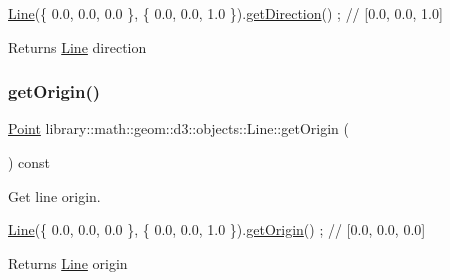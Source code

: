 \begin{DoxyCode}
\hyperlink{classlibrary_1_1math_1_1geom_1_1d3_1_1objects_1_1_line_a762e529453ff9ffa9233fd73737f4692}{Line}(\{ 0.0, 0.0, 0.0 \}, \{ 0.0, 0.0, 1.0 \}).\hyperlink{classlibrary_1_1math_1_1geom_1_1d3_1_1objects_1_1_line_aa108a53227e4326188fe17a03c55f9cb}{getDirection}() ; \textcolor{comment}{// [0.0, 0.0, 1.0]}
\end{DoxyCode}


\begin{DoxyReturn}{Returns}
\hyperlink{classlibrary_1_1math_1_1geom_1_1d3_1_1objects_1_1_line}{Line} direction 
\end{DoxyReturn}
\mbox{\label{classlibrary_1_1math_1_1geom_1_1d3_1_1objects_1_1_line_ad65178573d705ad21bdd54e7f4b7f104}} 
\subsubsection{\texorpdfstring{get\+Origin()}{getOrigin()}}
{\footnotesize\ttfamily \hyperlink{classlibrary_1_1math_1_1geom_1_1d3_1_1objects_1_1_point}{Point} library\+::math\+::geom\+::d3\+::objects\+::\+Line\+::get\+Origin (\begin{DoxyParamCaption}{ }\end{DoxyParamCaption}) const}



Get line origin. 


\begin{DoxyCode}
\hyperlink{classlibrary_1_1math_1_1geom_1_1d3_1_1objects_1_1_line_a762e529453ff9ffa9233fd73737f4692}{Line}(\{ 0.0, 0.0, 0.0 \}, \{ 0.0, 0.0, 1.0 \}).\hyperlink{classlibrary_1_1math_1_1geom_1_1d3_1_1objects_1_1_line_ad65178573d705ad21bdd54e7f4b7f104}{getOrigin}() ; \textcolor{comment}{// [0.0, 0.0, 0.0]}
\end{DoxyCode}


\begin{DoxyReturn}{Returns}
\hyperlink{classlibrary_1_1math_1_1geom_1_1d3_1_1objects_1_1_line}{Line} origin 
\end{DoxyReturn}
\mbox{\label{classlibrary_1_1math_1_1geom_1_1d3_1_1objects_1_1_line_af40668ee33a6cd265a4b3c3a9a53f294}} 

